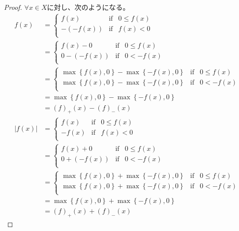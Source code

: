\documentclass[dvipdfmx]{jsarticle}
\begin{document}
\begin{proof} $\forall x \in X$に対し、次のようになる。
\begin{align*}
f(x) &= \left\{ \begin{matrix}
f(x) & \mathrm{if} & 0 \leq f(x) \\
 - \left( - f(x) \right) & \mathrm{if} & f(x) < 0 \\
\end{matrix} \right.\ \\
&= \left\{ \begin{matrix}
f(x) - 0 & \mathrm{if} & 0 \leq f(x) \\
0 - \left( - f(x) \right) & \mathrm{if} & 0 < - f(x) \\
\end{matrix} \right.\ \\
&= \left\{ \begin{matrix}
\max\left\{ f(x),0 \right\} - \max\left\{ - f(x),0 \right\} & \mathrm{if} & 0 \leq f(x) \\
\max\left\{ f(x),0 \right\} - \max\left\{ - f(x),0 \right\} & \mathrm{if} & 0 < - f(x) \\
\end{matrix} \right.\ \\
&= \max\left\{ f(x),0 \right\} - \max\left\{ - f(x),0 \right\}\\
&= (f)_{+}(x) - (f)_{-}(x)\\
\left| f(x) \right| &= \left\{ \begin{matrix}
f(x) & \mathrm{if} & 0 \leq f(x) \\
 - f(x) & \mathrm{if} & f(x) < 0 \\
\end{matrix} \right.\ \\
&= \left\{ \begin{matrix}
f(x) + 0 & \mathrm{if} & 0 \leq f(x) \\
0 + \left( - f(x) \right) & \mathrm{if} & 0 < - f(x) \\
\end{matrix} \right.\ \\
&= \left\{ \begin{matrix}
\max\left\{ f(x),0 \right\} + \max\left\{ - f(x),0 \right\} & \mathrm{if} & 0 \leq f(x) \\
\max\left\{ f(x),0 \right\} + \max\left\{ - f(x),0 \right\} & \mathrm{if} & 0 < - f(x) \\
\end{matrix} \right.\ \\
&= \max\left\{ f(x),0 \right\} + \max\left\{ - f(x),0 \right\}\\
&= (f)_{+}(x) + (f)_{-}(x)
\end{align*}
\end{proof}
\end{document}
